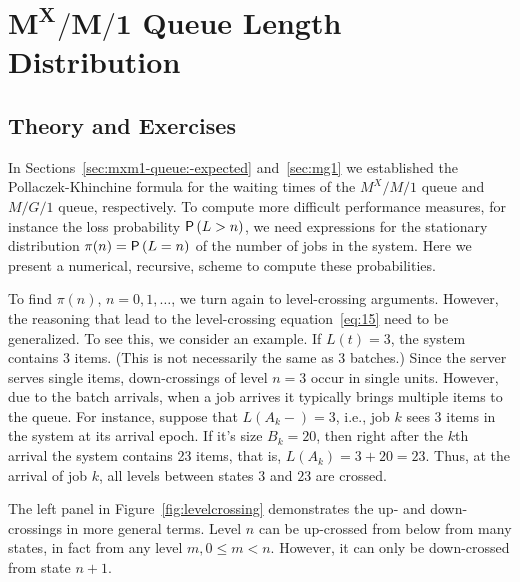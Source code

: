 \section
[$M^X/M/1$ Queue Length Distribution]
{$\mathbf{M^X/M/1}$ Queue Length Distribution}
\label{sec:batch-arrivals}


\subsection*{Theory and Exercises}


In Sections~\ref{sec:mxm1-queue:-expected} and~\ref{sec:mg1} we established the Pollaczek-Khinchine formula for the waiting times of the $M^X/M/1$ queue and $M/G/1$ queue, respectively.
To compute more difficult performance measures, for instance the loss probability $\P{L>n}$, we need expressions for the stationary distribution $\pi(n)=\P{L=n}$ of the number of jobs in the system.
Here we present a numerical, recursive, scheme to compute these probabilities.

To find $\pi(n)$, $n=0, 1, \ldots$, we turn again to level-crossing arguments.
However, the reasoning that lead to the level-crossing equation~\eqref{eq:15} need to be generalized.
To see this, we consider an example.
If $L(t)=3$, the system contains $3$ items.
(This is not necessarily the same as 3 batches.)
Since the server serves single items, down-crossings of level $n=3$ occur in single units.
However, due to the batch arrivals, when a job arrives it typically brings multiple items to the queue.
For instance, suppose that $L(A_k-) = 3$, i.e., job $k$ sees 3 items in the system at its arrival epoch.
If it's size $B_k = 20$, then right after the $k$th arrival the system contains 23 items, that is, $L(A_k)=3+20=23$.
Thus, at the arrival of job $k$, all levels between states $3$ and $23$ are crossed.

The left panel in Figure~\ref{fig:levelcrossing} demonstrates the up- and down-crossings in more general terms.  Level $n$ can be up-crossed
from below from many states, in fact from any level $m, 0\leq m <n$. However,
it can only be down-crossed from state $n+1$.



